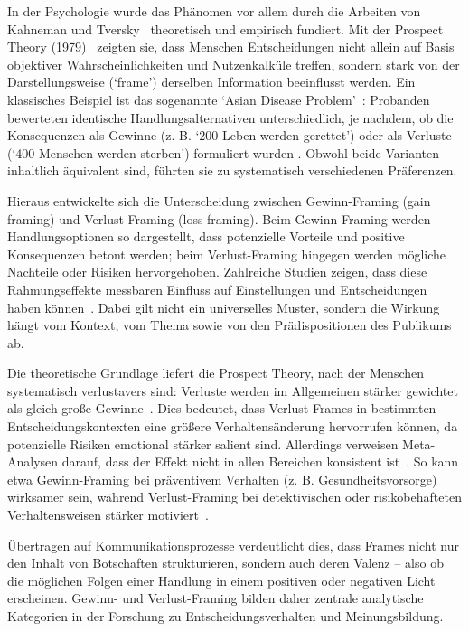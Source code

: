 \documentclass[
	12pt, %
	a4paper,
	listof=totoc, %
  bibliography=totoc, %
	numbers=noenddot, %
	german, %
	headsepline, %
	oneside %
	]{scrbook} %
\begin{document}
In der Psychologie wurde das Phänomen vor allem durch die Arbeiten von Kahneman und Tversky~\parencite{kahneman_prospect_1979} theoretisch und empirisch fundiert. Mit der Prospect Theory (1979)~\parencite{kahneman_prospect_1979} zeigten sie, dass Menschen Entscheidungen nicht allein auf Basis objektiver Wahrscheinlichkeiten und Nutzenkalküle treffen, sondern stark von der Darstellungsweise (`frame') derselben Information beeinflusst werden. Ein klassisches Beispiel ist das sogenannte `Asian Disease Problem'~\parencite{tversky1981framing}: Probanden bewerteten identische Handlungsalternativen unterschiedlich, je nachdem, ob die Konsequenzen als Gewinne (z. B. `200 Leben werden gerettet') oder als Verluste (`400 Menschen werden sterben') formuliert wurden . Obwohl beide Varianten inhaltlich äquivalent sind, führten sie zu systematisch verschiedenen Präferenzen.

Hieraus entwickelte sich die Unterscheidung zwischen Gewinn-Framing (gain framing) und Verlust-Framing (loss framing). Beim Gewinn-Framing werden Handlungsoptionen so dargestellt, dass potenzielle Vorteile und positive Konsequenzen betont werden; beim Verlust-Framing hingegen werden mögliche Nachteile oder Risiken hervorgehoben. Zahlreiche Studien zeigen, dass diese Rahmungseffekte messbaren Einfluss auf Einstellungen und Entscheidungen haben können~\parencite{levin_schneider_gaeth_1998,kuhberger_framing_meta_1998}. Dabei gilt nicht ein universelles Muster, sondern die Wirkung hängt vom Kontext, vom Thema sowie von den Prädispositionen des Publikums ab.

Die theoretische Grundlage liefert die Prospect Theory, nach der Menschen systematisch verlustavers sind: Verluste werden im Allgemeinen stärker gewichtet als gleich große Gewinne~\parencite{kahneman_prospect_1979}. Dies bedeutet, dass Verlust-Frames in bestimmten Entscheidungskontexten eine größere Verhaltensänderung hervorrufen können, da potenzielle Risiken emotional stärker salient sind. Allerdings verweisen Meta-Analysen darauf, dass der Effekt nicht in allen Bereichen konsistent ist~\parencite{okeeffe_jensen_2007}. So kann etwa Gewinn-Framing bei präventivem Verhalten (z. B. Gesundheitsvorsorge) wirksamer sein, während Verlust-Framing bei detektivischen oder risikobehafteten Verhaltensweisen stärker motiviert~\parencite{rothman_etal_1993}.

Übertragen auf Kommunikationsprozesse verdeutlicht dies, dass Frames nicht nur den Inhalt von Botschaften strukturieren, sondern auch deren Valenz – also ob die möglichen Folgen einer Handlung in einem positiven oder negativen Licht erscheinen. Gewinn- und Verlust-Framing bilden daher zentrale analytische Kategorien in der Forschung zu Entscheidungsverhalten und Meinungsbildung.
\end{document}
